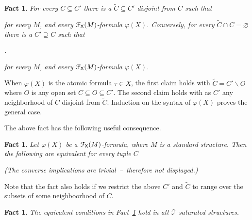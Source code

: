 \documentclass{amsproc}
\makeatletter
\newcounter{thm}
\theoremstyle{mio}
\newtheorem{fact}[thm]{Fact}\tcolorboxenvironment{fact}{mythm}
\providecommand{\proofNameStyle}{\bfseries}
\renewenvironment{proof}[1][\proofname]{\par
  \pushQED{\qed}%
  \normalfont%
  \trivlist
  \item[\hskip\labelsep
        \proofNameStyle
    #1\@addpunct{.}]\ignorespaces
}{%
  \popQED\endtrivlist\@endpefalse
}
\makeatother
\begin{document}
\begin{fact}
  For every $C\subseteq C'$ there is a $\tilde C\subseteq C'$ disjoint from $C$ such that\smallskip
  
  \smallskip

  for every $M$, and every ${\EuScript F}_{\sf X}(M)$-formula $\varphi(X)$.
  Conversely, for every $\tilde C\cap C=\varnothing$ there is a $C'\supseteq C$ such that

  .\smallskip

  for every $M$, and every ${\EuScript F}_{\sf X}(M)$-formula $\varphi(X)$.
\end{fact}

\begin{proof}
  When $\varphi(X)$ is the atomic formula $\tau\in X$, the first claim holds with $\tilde C=C'\smallsetminus O$ where $O$ is any open set $C\subseteq O\subseteq C'$.
  The second claim holds with as $C'$ any neighborhood of $C$ disjoint from $\tilde C$.
  Induction on the syntax of $\varphi(X)$ proves the general case.
\end{proof}

The above fact has the following useful consequence.

\begin{fact}\label{fact_otto}
  Let $\varphi(X)$ be a ${\EuScript F}_{\sf X}(M)$-formula, where $M$ is a standard structure.
  Then the following are equivalent for every tuple $C$\smallskip
  
    \smallskip

    \smallskip

  (The converse implications are trivial~--~therefore not displayed.)
\end{fact}


Note that the fact also holds if we restrict the above $C'$ and $\tilde C$ to range over the subsets of some neighboorhood of $C$.

\begin{fact}\label{fact_saturation}
  The equivalent conditions in Fact~\ref{fact_otto} hold in all ${\EuScript F}$-saturated structures.
\end{fact}
\end{document}
